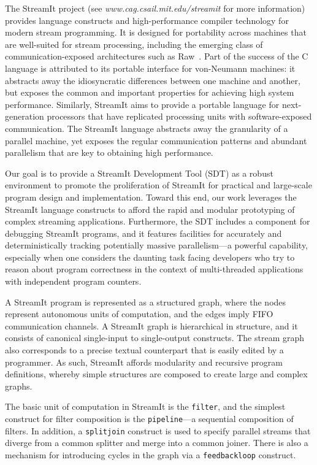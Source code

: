 \documentclass{csailabstractbook}
\begin{document}
The  StreamIt  project  (see {\it www.cag.csail.mit.edu/streamit}  for  more
information) provides language constructs and high-performance
compiler technology for modern  stream programming. It is designed for
portability   across  machines   that  are   well-suited   for  stream
processing,  including  the  emerging class  of  communication-exposed
architectures such  as Raw~\cite{raw}.  Part  of the success of  the C
language  is  attributed to  its  portable  interface for  von-Neumann
machines: it abstracts away  the idiosyncratic differences between one
machine and  another, but exposes the common  and important properties
for achieving  high system  performance.  Similarly, StreamIt  aims to
provide a  portable language for next-generation  processors that have
replicated processing units  with software-exposed communication.  The
StreamIt  language  abstracts  away  the  granularity  of  a  parallel
machine, yet  exposes the regular communication  patterns and abundant
parallelism that are key to obtaining high performance.

Our goal is  to provide a StreamIt Development Tool  (SDT) as a robust
environment to promote the proliferation of StreamIt for practical and
large-scale program  design and  implementation. Toward this  end, our
work leverages  the StreamIt language  constructs to afford  the rapid
and      modular       prototyping      of      complex      streaming
applications. Furthermore, the SDT  includes a component for debugging
StreamIt  programs,  and it  features  facilities  for accurately  and
deterministically   tracking   potentially   massive   parallelism---a
powerful capability,  especially when one considers  the daunting task
facing developers who  try to reason about program  correctness in the
context of multi-threaded applications with independent program counters.


A StreamIt  program is  represented as a  structured graph,  where the
nodes represent  autonomous units of computation, and  the edges imply
FIFO  communication channels.   A  StreamIt graph  is hierarchical  in
structure, and it consists  of canonical single-input to single-output
constructs.  The  stream graph also  corresponds to a  precise textual
counterpart that is easily edited  by a programmer.  As such, StreamIt
affords modularity  and recursive program  definitions, whereby simple
structures are composed to create large and complex graphs.

The basic unit of computation in StreamIt is the {\tt filter}, and the
simplest construct  for filter  composition is the  {\tt pipeline}---a
sequential  composition of  filters.  In  addition, a  {\tt splitjoin}
construct  is used  to specify  parallel streams  that diverge  from a
common  splitter and  merge  into a  common  joiner. There  is also  a
mechanism for introducing cycles in the graph via a {\tt feedbackloop}
construct.
\end{document}
